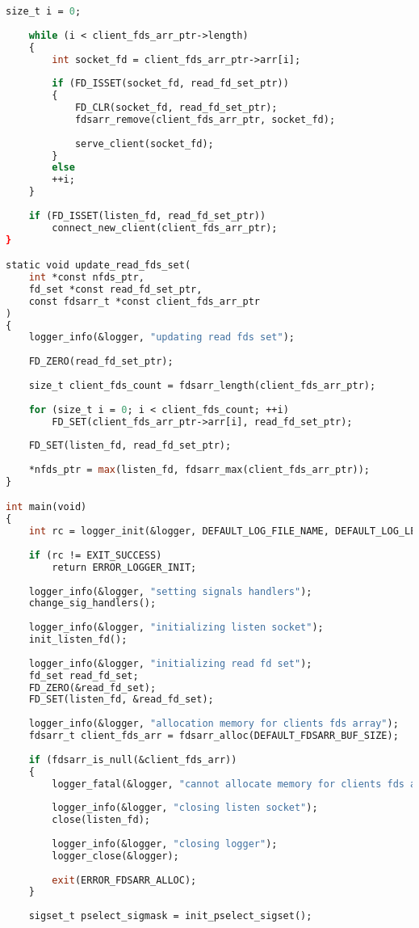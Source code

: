\begin{lstlisting}[label=server_code,caption=Реализация статического веб-сервера,language=Caml]
	size_t i = 0;
	
	while (i < client_fds_arr_ptr->length)
	{
		int socket_fd = client_fds_arr_ptr->arr[i];
		
		if (FD_ISSET(socket_fd, read_fd_set_ptr))
		{
			FD_CLR(socket_fd, read_fd_set_ptr);
			fdsarr_remove(client_fds_arr_ptr, socket_fd);
			
			serve_client(socket_fd);
		}
		else
		++i;
	}
	
	if (FD_ISSET(listen_fd, read_fd_set_ptr))
		connect_new_client(client_fds_arr_ptr);
}

static void update_read_fds_set(
	int *const nfds_ptr,
	fd_set *const read_fd_set_ptr,
	const fdsarr_t *const client_fds_arr_ptr
)
{
	logger_info(&logger, "updating read fds set");
	
	FD_ZERO(read_fd_set_ptr);
	
	size_t client_fds_count = fdsarr_length(client_fds_arr_ptr);
	
	for (size_t i = 0; i < client_fds_count; ++i)
		FD_SET(client_fds_arr_ptr->arr[i], read_fd_set_ptr);
	
	FD_SET(listen_fd, read_fd_set_ptr);
	
	*nfds_ptr = max(listen_fd, fdsarr_max(client_fds_arr_ptr));
}

int main(void)
{
	int rc = logger_init(&logger, DEFAULT_LOG_FILE_NAME, DEFAULT_LOG_LEVEL);
	
	if (rc != EXIT_SUCCESS)
		return ERROR_LOGGER_INIT;
	
	logger_info(&logger, "setting signals handlers");
	change_sig_handlers();
	
	logger_info(&logger, "initializing listen socket");
	init_listen_fd();
	
	logger_info(&logger, "initializing read fd set");
	fd_set read_fd_set;
	FD_ZERO(&read_fd_set);
	FD_SET(listen_fd, &read_fd_set);
	
	logger_info(&logger, "allocation memory for clients fds array");
	fdsarr_t client_fds_arr = fdsarr_alloc(DEFAULT_FDSARR_BUF_SIZE);
	
	if (fdsarr_is_null(&client_fds_arr))
	{
		logger_fatal(&logger, "cannot allocate memory for clients fds array");
		
		logger_info(&logger, "closing listen socket");
		close(listen_fd);
		
		logger_info(&logger, "closing logger");
		logger_close(&logger);
		
		exit(ERROR_FDSARR_ALLOC);
	}
	
	sigset_t pselect_sigmask = init_pselect_sigset();
	

\end{lstlisting}
